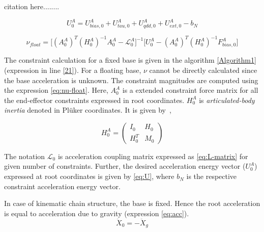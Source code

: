 
{\color{red} citation here........}

\begin{equation}\label{eq:U}
	U_0^A = U_{bias, 0}^A + U_{tau, 0}^A + U_{qdd, 0}^A + U_{ext, 0}^A - b_N 
\end{equation}

\begin{equation}\label{eq:nu-float}
	\nu_{float} = \big[ (A_0^A)^T (H_0^A)^{-1} A_0^A - \mathcal{L}_0^A \big]^{-1} \big[ U_0^A - (A_0^A)^T (H_0^A)^{-1} F_{bias, 0}^A \big]
\end{equation}


The constraint calculation for a fixed base is given in the algorithm \ref{Algorithm1} (expression in line \ref{21}). For a floating base, $\nu$ cannot be directly calculated since the base acceleration is unknown. The constraint magnitudes are computed using the expression \ref{eq:nu-float}. Here, $A_0^A$ is a extended constraint force matrix for all the end-effector constraints expressed in root coordinates. $H_0^A$ is \textit{articulated-body inertia} denoted in Pl{\"u}ker coordinates. It is given by~\cite{featherstone2014rigid},

\begin{equation}
	\label{eq:RBI}
	H_0^A = \begin{pmatrix}
		I_0 & H_0 \\
		H_0^T & M_0
	\end{pmatrix}
\end{equation}

The notation $\mathcal{L}_0$ is acceleration coupling matrix expressed as \ref{eq:L-matrix} for given number of constraints. Further, the desired acceleration energy vector ($U_0^A$) expressed at root coordinates is given by \ref{eq:U}, where $b_N$ is the respective constraint acceleration energy vector. 


In case of kinematic chain structure, the base is fixed. Hence the root acceleration is equal to acceleration due to gravity (expression \ref{eq:acc}). 
\begin{equation}
	\label{eq:acc}
	\ddot{X}_0 = -\ddot{X}_g
\end{equation}

